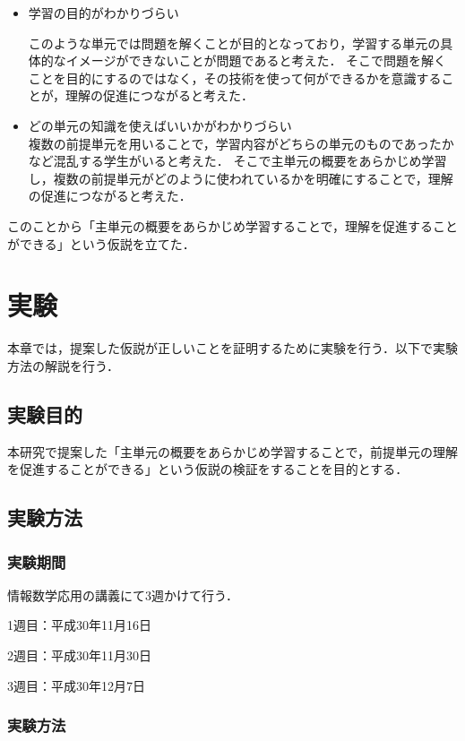 \documentclass[a4j,12pt]{jsarticle}
\begin{document}
\begin{itemize}
\item 学習の目的がわかりづらい

このような単元では問題を解くことが目的となっており，学習する単元の具体的なイメージができないことが問題であると考えた．
そこで問題を解くことを目的にするのではなく，その技術を使って何ができるかを意識することが，理解の促進につながると考えた．


\item どの単元の知識を使えばいいかがわかりづらい\\
複数の前提単元を用いることで，学習内容がどちらの単元のものであったかなど混乱する学生がいると考えた．
そこで主単元の概要をあらかじめ学習し，複数の前提単元がどのように使われているかを明確にすることで，理解の促進につながると考えた．

\end{itemize}

このことから「主単元の概要をあらかじめ学習することで，理解を促進することができる」という仮説を立てた．


\newpage
\section{実験}
本章では，提案した仮説が正しいことを証明するために実験を行う．以下で実験方法の解説を行う．
\subsection{実験目的}
本研究で提案した「主単元の概要をあらかじめ学習することで，前提単元の理解を促進することができる」という仮説の検証をすることを目的とする．

\subsection{実験方法}
\subsubsection{実験期間}

情報数学応用の講義にて3週かけて行う．

1週目：平成30年11月16日

2週目：平成30年11月30日

3週目：平成30年12月7日


\subsubsection{実験方法}
\end{document}
